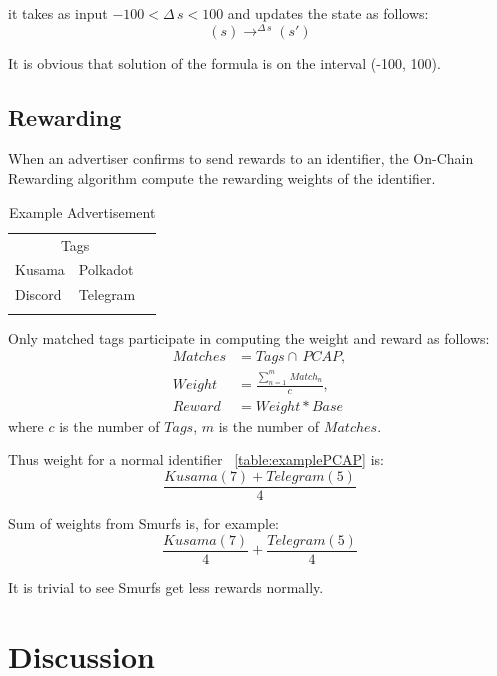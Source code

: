 \documentclass[twoside,twocolumn]{article}
\begin{document}
it takes as input $-100<\Delta\,s<100$ and updates the state as follows:
\[
    (s)\mathop{\to}^{\Delta\,s}({s}')
\]

It is obvious that solution of the formula is on the interval (-100, 100).

\subsection{Rewarding}

When an advertiser confirms to send rewards to an identifier,
the On-Chain Rewarding algorithm compute the rewarding weights of the identifier.

\begin{table}
    \centering
    \begin{tabular}{llr}
        \toprule
        \multicolumn{2}{c}{Tags} \\
        \cmidrule(r){1-2}
        Kusama  & Polkadot       \\
        Discord & Telegram       \\
        \midrule
                &          &     \\
        \bottomrule
    \end{tabular}
    \caption{Example Advertisement}
    \label{table:exampleAdvertisement}
\end{table}

Only matched tags participate in computing the weight and reward as follows:
\begin{align*}
    Matches & =Tags\cap\,PCAP,                     \\
    Weight  & = \frac{\sum_{n=1}^{m}\,Match_n}{c}, \\
    Reward  & =Weight*Base
\end{align*}
where $c$ is the number of $Tags$, $m$ is the number of $Matches$.

Thus weight for a normal identifier ~\ref{table:examplePCAP} is:
\[
    \frac{Kusama(7)+Telegram(5)}{4}
\]

Sum of weights from Smurfs is, for example:
\[
    \frac{Kusama(7)}{4}+\frac{Telegram(5)}{4}
\]

It is trivial to see Smurfs get less rewards normally.


\section{Discussion}
\end{document}
